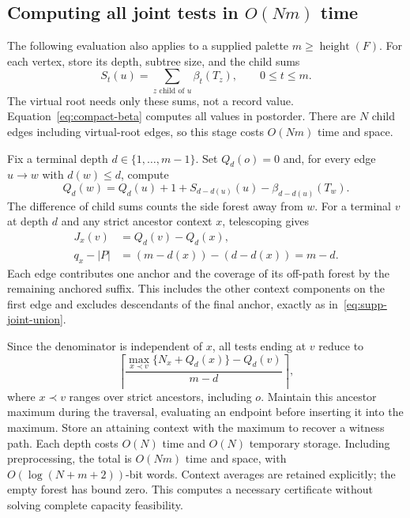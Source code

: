 \subsection{Computing all joint tests in $O(Nm)$ time}
\label{sec:joint-evaluation}
The following evaluation also applies to a supplied palette
$m\ge\operatorname{height}(F)$. For each vertex, store its depth,
subtree size, and the child sums
\begin{equation}
 S_t(u)=\sum_{z\text{ child of }u}\beta_t(T_z),
 \qquad 0\le t\le m.
 \label{eq:supp-child-coverage}
\end{equation}
The virtual root needs only these sums, not a record value.
Equation~\eqref{eq:compact-beta} computes all values in postorder.
There are $N$ child edges including virtual-root edges, so this stage
costs $O(Nm)$ time and space.

Fix a terminal depth $d\in\{1,\ldots,m-1\}$. Set $Q_d(o)=0$ and, for
every edge $u\to w$ with $d(w)\le d$, compute
\begin{equation}
 Q_d(w)=Q_d(u)+1+S_{d-d(u)}(u)-\beta_{d-d(u)}(T_w).
 \label{eq:supp-joint-potential}
\end{equation}
The difference of child sums counts the side forest away from $w$.
For a terminal $v$ at depth $d$ and any strict ancestor context $x$,
telescoping gives
\begin{align}
 J_x(v)&=Q_d(v)-Q_d(x),\label{eq:supp-joint-telescope}\\
 q_x-|P|&=(m-d(x))-(d-d(x))=m-d.
 \label{eq:supp-joint-denominator}
\end{align}
Each edge contributes one anchor and the coverage of its off-path
forest by the remaining anchored suffix. This includes the other
context components on the first edge and excludes descendants of
the final anchor, exactly as in~\eqref{eq:supp-joint-union}.

Since the denominator is independent of $x$, all tests ending at $v$
reduce to
\begin{equation}
 \left\lceil
 \frac{\max_{x\prec v}\{N_x+Q_d(x)\}-Q_d(v)}{m-d}
 \right\rceil,
 \label{eq:supp-joint-scan}
\end{equation}
where $x\prec v$ ranges over strict ancestors, including $o$.
Maintain this ancestor maximum during the traversal, evaluating an
endpoint before inserting it into the maximum. Store an attaining
context with the maximum to recover a witness path. Each depth costs
$O(N)$ time and $O(N)$ temporary storage. Including preprocessing, the
total is $O(Nm)$ time and space, with
$O(\log(N+m+2))$-bit words. Context averages are retained explicitly;
the empty forest has bound zero. This computes a necessary certificate
without solving complete capacity feasibility.

